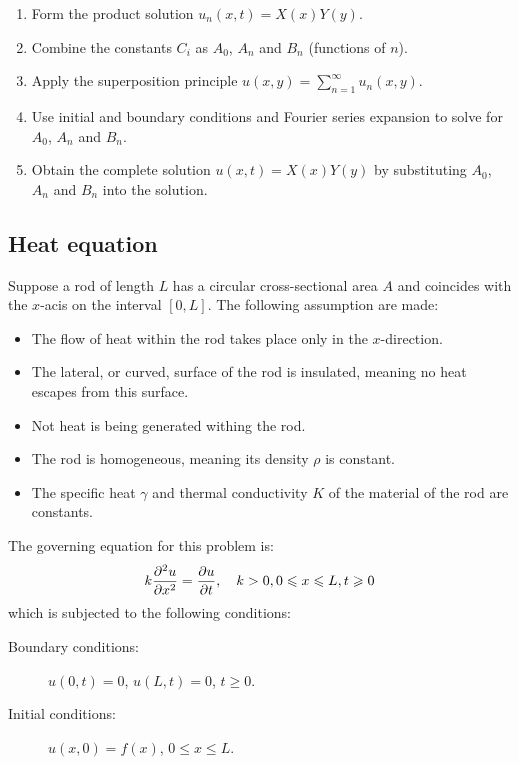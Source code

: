 \documentclass[10pt, twocolumn]{article}
\begin{document}
\begin{enumerate}
  \item Form the product solution \(u_n(x,t) = X(x)Y(y)\).
  \item Combine the constants \(C_i\) as \(A_0\), \(A_n\) and \(B_n\) (functions of \(n\)).
  \item Apply the superposition principle \(u(x,y) = \sum_{n = 1}^\infty{u_n(x,y)}\).
  \item Use initial and boundary conditions and Fourier series expansion to solve for \(A_0\), \(A_n\) and \(B_n\).
  \item Obtain the complete solution \(u(x,t) = X(x)Y(y)\) by substituting \(A_0\), \(A_n\) and \(B_n\) into the solution.
\end{enumerate}


\subsection{Heat equation}
Suppose a rod of length \(L\) has a circular cross-sectional area \(A\) and coincides with the \(x\)-acis on the interval \([0, L]\).
The following assumption are made:
\begin{itemize}
  \item The flow of heat within the rod takes place only in the \(x\)-direction.
  \item The lateral, or curved, surface of the rod is insulated, meaning no heat escapes from this surface.
  \item Not heat is being generated withing the rod.
  \item The rod is homogeneous, meaning its density \(\rho\) is constant.
  \item The specific heat \(\gamma\) and thermal conductivity \(K\) of the material of the rod are constants.
\end{itemize}

The governing equation for this problem is:
\[
  k \frac{\partial^{2} u}{\partial x^{2}} = \frac{\partial u}{\partial t}, \quad k > 0, 0 \leqslant x \leqslant L, t \geqslant 0
\]
which is subjected to the following conditions:
\begin{description}
  \item[Boundary conditions:] \(u(0,t) = 0\), \(u(L,t) = 0\), \(t \geqslant 0\).
  \item[Initial conditions:] \(u(x,0) = f(x)\), \(0 \leqslant x \leqslant L\).
\end{description}
\end{document}
